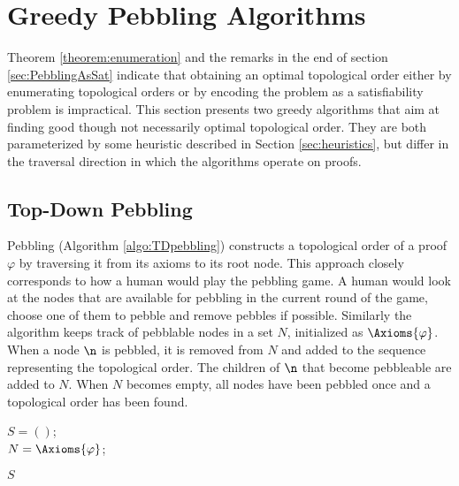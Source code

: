 \section{Greedy Pebbling Algorithms}
\label{sec:algorithms}

Theorem \ref{theorem:enumeration} and the remarks in the end of section \ref{sec:PebblingAsSat} indicate that obtaining an optimal topological order either by enumerating topological orders or by encoding the problem as a satisfiability problem is impractical. 
This section presents two greedy algorithms that aim at finding good though not necessarily optimal topological order. 
They are both parameterized by some heuristic described in Section \ref{sec:heuristics}, but differ in the traversal direction in which the algorithms operate on proofs.

\subsection{Top-Down Pebbling}

 Pebbling (Algorithm \ref{algo:TDpebbling}) constructs a topological order of a proof $\varphi$ by traversing it from its axioms to its root node.
This approach closely corresponds to how a human would play the pebbling game. 
A human would look at the nodes that are available for pebbling in the current round of the game, choose one of them to pebble and remove pebbles if possible.
Similarly the algorithm keeps track of pebblable nodes in a set $N$, initialized as $\Axioms{\varphi}$.
When a node $\n$ is pebbled, it is removed from $N$ and added to the sequence representing the topological order. The children of $\n$ that become pebbleable are added to $N$.
When $N$ becomes empty, all nodes have been pebbled once and a topological order has been found.


\begin{algorithm}[h]
	
	$S = ()$;  \\
	$N = \Axioms{\varphi}$; 
	
	
	\Return $S$\;
	
  \caption[.]{}
  \label{algo:TDpebbling}
\end{algorithm}

